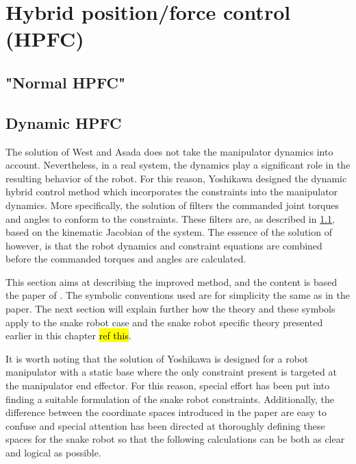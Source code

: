 \section{Hybrid position/force control (HPFC)}

\subsection{"Normal HPFC"} \label{subseq:HPFC}


\subsection{Dynamic HPFC} \label{subsec:DHPFC}

The solution of West and Asada \cite{west1985method} does not take the manipulator dynamics into account. Nevertheless, in a real system, the dynamics play a significant role in the resulting behavior of the robot. For this reason, Yoshikawa \cite{yoshikawa1987dynamic} designed the dynamic hybrid control method which incorporates the constraints into the manipulator dynamics. More specifically, the solution of \cite{west1985method} filters the commanded joint torques and angles to conform to the constraints. These filters are, as described in \ref{subseq:HPFC}, based on the kinematic Jacobian of the system. The essence of the solution of \cite{yoshikawa1987dynamic} however, is that the robot dynamics and constraint equations are combined before the commanded torques and angles are calculated. 

This section aims at describing the improved method, and the content is based the paper of \cite{yoshikawa1987dynamic}. The symbolic conventions used are for simplicity the same as in the paper. The next section will explain further how the theory and these symbols apply to the snake robot case and the snake robot specific theory presented earlier in this chapter \hl{ref this}.

It is worth noting that the solution of Yoshikawa is designed for a robot manipulator with a static base where the only constraint present is targeted at the manipulator end effector. For this reason, special effort has been put into finding a suitable formulation of the snake robot constraints. Additionally, the difference between the coordinate spaces introduced in the paper are easy to confuse and special attention has been directed at thoroughly defining these spaces for the snake robot so that the following calculations can be both as clear and logical as possible.

